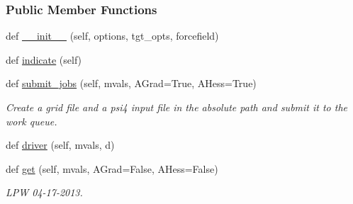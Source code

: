 \subsubsection*{Public Member Functions}
\begin{DoxyCompactItemize}
\item 
def \hyperlink{classsrc_1_1psi4io_1_1RDVR3__Psi4_a53e16387e30639e452ed481c17e185c4}{\+\_\+\+\_\+init\+\_\+\+\_\+} (self, options, tgt\+\_\+opts, forcefield)
\item 
def \hyperlink{classsrc_1_1psi4io_1_1RDVR3__Psi4_ae085fa527303ce6edea37e8312b4e349}{indicate} (self)
\item 
def \hyperlink{classsrc_1_1psi4io_1_1RDVR3__Psi4_ac43c586173ba9bff909a1584862961ad}{submit\+\_\+jobs} (self, mvals, A\+Grad=True, A\+Hess=True)
\begin{DoxyCompactList}\small\item\em Create a grid file and a psi4 input file in the absolute path and submit it to the work queue. \end{DoxyCompactList}\item 
def \hyperlink{classsrc_1_1psi4io_1_1RDVR3__Psi4_a27e2839718816408337e0a2422add630}{driver} (self, mvals, d)
\item 
def \hyperlink{classsrc_1_1psi4io_1_1RDVR3__Psi4_a6addfdcc8d67ff8adcd99a03e30b8283}{get} (self, mvals, A\+Grad=False, A\+Hess=False)
\begin{DoxyCompactList}\small\item\em L\+PW 04-\/17-\/2013. \end{DoxyCompactList}\end{DoxyCompactItemize}
